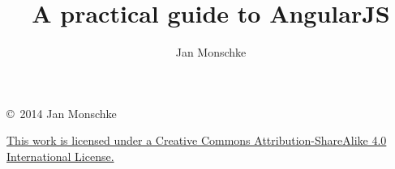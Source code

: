 \author{Jan Monschke}
\title{A practical guide to AngularJS}








\thispagestyle{empty}
\phantom{a}
\vfill

\noindent \copyright \ 2014 Jan Monschke

\noindent \href{http://creativecommons.org/licenses/by-sa/4.0/}{This work is licensed under a Creative Commons Attribution-ShareAlike 4.0 International License.}

\vfill





\newpage
\listoffigures
\newpage
\lstlistoflistings




